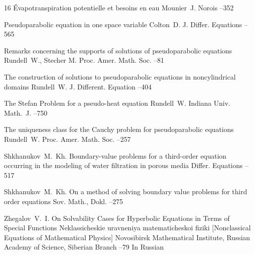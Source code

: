 \begin{thebibliography}{16}
\paper  \'Evapotranspiration potentielle et besoins en eau 
\by Mounier~J.
\jour Norois
--352


\paper Pseudoparabolic equation in one space variable
\by Colton~D.
\jour J. Differ. Equations
--565

\paper Remarks concerning the supports of solutions of pseudoparabolic equations
\by Rundell~W., Stecher M.
\jour Proc. Amer. Math. Soc.
--81

\paper The construction of solutions to pseudoparabolic equations in noncylindrical domains
\by Rundell~W.
\jour J. Different. Equation
--404

\paper The Stefan Problem for a pseudo-heat equation
\by Rundell~W.
\jour Indiana Univ. Math.~J.
--750

\paper The uniqueness class for the Cauchy problem for pseudoparabolic equations
\by Rundell~W.
\jour Proc. Amer. Math. Soc.
--257

\by Shkhanukov~M.~Kh.
\paper Boundary-value problems for a third-order equation occurring in the modeling of water filtration in porous media
\jour Differ. Equations
--517 



\by Shkhanukov~M.~Kh.
\paper On a method of solving boundary value problems for third order equations
\jour Sov. Math., Dokl. 
--275 






\by Zhegalov~V.~I.
\paper On Solvability Cases for Hyperbolic Equations in Terms of Special Functions
\inbook Neklassicheskie uravneniya matematicheskoi fiziki \rm [Nonclassical Equations of Mathematical Physics]
\publaddr Novosibirsk
\publ Mathematical Institute, Russian Academy of Science, Siberian Branch
–79
\lang In Russian




\end{thebibliography}

